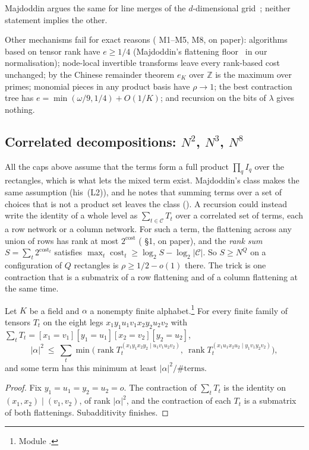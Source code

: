 \documentclass[10pt]{amsart}
\theoremstyle{plain}
\theoremstyle{definition}
\theoremstyle{remark}
\numberwithin{equation}{section}
\newcommand{\Z}{\mathbb{Z}}
\newcommand{\rk}{\operatorname{rank}}
\newcommand{\cost}{\operatorname{cost}}
\begin{document}
\noindent Majdoddin argues the same for line merges of the $d$-dimensional grid~\cite[\S4.8]{Maj26}; neither
statement implies the other.

\noindent Other mechanisms fail for exact reasons ( M1--M5, M8, on
paper): algorithms based on tensor rank have $e\ge1/4$ (Majdoddin's flattening
floor~\cite[Proposition~2.4(b)]{Maj26} in our normalisation); node-local invertible transforms leave every
rank-based cost unchanged; by the Chinese remainder theorem $e_K$ over $\Z$ is the maximum over primes;
monomial pieces in any product basis have $\rho\to1$; the best contraction tree has
$e=\min(\omega/9,1/4)+O(1/K)$; and recursion on the bits of $\lambda$ gives nothing.

\subsection{Correlated decompositions: \texorpdfstring{$N^2$, $N^3$, $N^8$}{N^2, N^3, N^8}}\label{sec:correlated}
All the caps above assume that the terms form a full product $\prod_qI_q$ over the rectangles, which
is what lets the mixed term exist. Majdoddin's class makes the same assumption (his~(L2)), and he notes
that summing terms over a set of choices that is not a product set leaves the class
(\cite[Remark~4.5]{Maj26}). A recursion could instead write the identity of a whole level as
$\sum_{t\in\mathcal C}T_t$ over a correlated set of terms, each a row network or a column network. For
such a term, the flattening across any union of rows has rank at most $2^{\cost}$ (
\S1, on paper), and the \emph{rank sum} $S=\sum_t2^{\cost_t}$ satisfies $\max_t\cost_t\ge\log_2S-\log_2|\mathcal C|$.
So $S\ge N^Q$ on a configuration of $Q$ rectangles is $\rho\ge1/2-o(1)$ there. The trick is one
contraction that is a submatrix of a row flattening and of a column flattening at the same time.

\begin{theorem}\label{thm:two}
Let $K$ be a field and $\alpha$ a nonempty finite alphabet.\footnote{Module
.} For every finite family of tensors $T_t$ on the
eight legs $x_1y_1u_1v_1x_2y_2u_2v_2$ with
$\sum_tT_t=[x_1=v_1][y_1=u_1][x_2=v_2][y_2=u_2]$,
\[
  |\alpha|^2\ \le\ \sum_t\min\bigl(\rk T_t^{(x_1y_1x_2y_2\mid u_1v_1u_2v_2)},\ \rk T_t^{(x_1u_1x_2u_2\mid y_1v_1y_2v_2)}\bigr),
\]
and some term has this minimum at least $|\alpha|^2/\#\text{terms}$.
\end{theorem}
\begin{proof}
Fix $y_1=u_1=y_2=u_2=o$. The contraction of $\sum_tT_t$ is the identity on $(x_1,x_2)\mid(v_1,v_2)$, of
rank $|\alpha|^2$, and the contraction of each $T_t$ is a submatrix of both flattenings. Subadditivity
finishes.
\end{proof}
\end{document}
